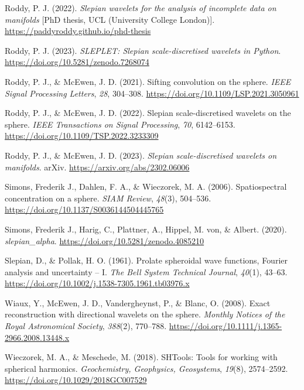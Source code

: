 \documentclass[
]{article}
\newlength{\cslhangindent}
\newlength{\cslentryspacingunit} %
\newenvironment{CSLReferences}[2] %
 {%
  \setlength{\parindent}{0pt}
  \ifodd #1
  \let\oldpar\par
  \def\par{\hangindent=\cslhangindent\oldpar}
  \fi
  \setlength{\parskip}{#2\cslentryspacingunit}
 }%
 {}
\begin{document}
\begin{CSLReferences}{1}{0}
\leavevmode{}%
Roddy, P. J. (2022). \emph{Slepian wavelets for the analysis of
incomplete data on manifolds} {[}PhD thesis, UCL (University College
London){]}. \url{https://paddyroddy.github.io/phd-thesis}

\leavevmode{}%
Roddy, P. J. (2023). \emph{SLEPLET: {S}lepian scale-discretised wavelets
in {P}ython}. \url{https://doi.org/10.5281/zenodo.7268074}

\leavevmode{}%
Roddy, P. J., \& McEwen, J. D. (2021). Sifting convolution on the
sphere. \emph{IEEE Signal Processing Letters}, \emph{28}, 304--308.
\url{https://doi.org/10.1109/LSP.2021.3050961}

\leavevmode{}%
Roddy, P. J., \& McEwen, J. D. (2022). Slepian scale-discretised
wavelets on the sphere. \emph{IEEE Transactions on Signal Processing},
\emph{70}, 6142--6153. \url{https://doi.org/10.1109/TSP.2022.3233309}

\leavevmode{}%
Roddy, P. J., \& McEwen, J. D. (2023). \emph{Slepian scale-discretised
wavelets on manifolds}. arXiv. \url{https://arxiv.org/abs/2302.06006}

\leavevmode{}%
Simons, Frederik J., Dahlen, F. A., \& Wieczorek, M. A. (2006).
Spatiospectral concentration on a sphere. \emph{SIAM Review},
\emph{48}(3), 504--536. \url{https://doi.org/10.1137/S0036144504445765}

\leavevmode{}%
Simons, Frederik J., Harig, C., Plattner, A., Hippel, M. von, \& Albert.
(2020). \emph{{slepian\_alpha}}.
\url{https://doi.org/10.5281/zenodo.4085210}

\leavevmode{}%
Slepian, D., \& Pollak, H. O. (1961). Prolate spheroidal wave functions,
{F}ourier analysis and uncertainty -- {I}. \emph{The Bell System
Technical Journal}, \emph{40}(1), 43--63.
\url{https://doi.org/10.1002/j.1538-7305.1961.tb03976.x}

\leavevmode{}%
Wiaux, Y., McEwen, J. D., Vandergheynst, P., \& Blanc, O. (2008). Exact
reconstruction with directional wavelets on the sphere. \emph{Monthly
Notices of the Royal Astronomical Society}, \emph{388}(2), 770--788.
\url{https://doi.org/10.1111/j.1365-2966.2008.13448.x}

\leavevmode{}%
Wieczorek, M. A., \& Meschede, M. (2018). {SHTools}: Tools for working
with spherical harmonics. \emph{Geochemistry, Geophysics, Geosystems},
\emph{19}(8), 2574--2592. \url{https://doi.org/10.1029/2018GC007529}

\end{CSLReferences}
\end{document}
